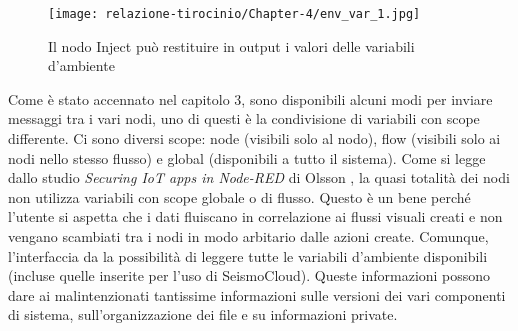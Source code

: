 \documentclass[a4paper,10pt]{memoir}
\begin{document}
\begin{figure}[ht]
    \texttt{[image: relazione-tirocinio/Chapter-4/env\_var\_1.jpg]}
    \caption{Il nodo Inject può restituire in output i valori delle variabili d'ambiente}
    \label{fig:env_var_1}
\end{figure}

Come è stato accennato nel capitolo 3, sono disponibili alcuni modi per inviare messaggi tra i vari nodi, uno di questi è la condivisione di variabili con scope differente.
Ci sono diversi scope: node (visibili solo al nodo), flow (visibili solo ai nodi nello stesso flusso) e global (disponibili a tutto il sistema).
Come si legge dallo studio \textit{Securing IoT apps in Node-RED} di Olsson \cite{securing}, la quasi totalità dei nodi non utilizza variabili con scope globale o di flusso. Questo è un bene perché l'utente si aspetta che i dati fluiscano in correlazione ai flussi visuali creati e non vengano scambiati tra i nodi in modo arbitario dalle azioni create.
Comunque, l'interfaccia da la possibilità di leggere tutte le variabili d'ambiente disponibili (incluse quelle inserite per l'uso di SeismoCloud). Queste informazioni possono dare ai malintenzionati tantissime informazioni sulle versioni dei vari componenti di sistema, sull'organizzazione dei file e su informazioni private.
\end{document}
